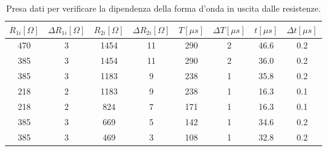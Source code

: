 \documentclass[10pt,a4paper]{article}
\begin{document}

\begin{table}[!htb]
\centering
\begin{tabular}{|c|c|c|c|c|c|c|c|}
\hline 
$R_{1i} [\Omega]$ & $\Delta R_{1i} [\Omega]$ & $R_{2i} [\Omega]$  & $\Delta R_{2i} [\Omega]$ & $T [\mu s]$ & $\Delta T [\mu s]$&$t [\mu s ]$ & $\Delta t [\mu s]$\\
\hline
 470 & 3 & 1454	& 11 & 290 & 2& 46.6& 0.2\\ 
\hline
385 & 3 & 1454	& 11 & 290 & 2& 36.0& 0.2\\ 
\hline 
 385 & 3 & 1183	& 9 & 238 & 1& 35.8& 0.2\\
\hline
218 & 2 & 1183	& 9 & 238 & 1& 16.3& 0.1\\ 
\hline
218 & 2 & 824	& 7 & 171 & 1& 16.3& 0.1\\ 
\hline
385 & 3 & 669	& 5 & 142 & 1& 34.6& 0.2\\ 
\hline
 385 & 3 & 469	& 3 & 108 & 1& 32.8& 0.2\\ 
 \hline
\end{tabular} 
\caption{Presa dati per verificare la dipendenza della forma d'onda in uscita dalle resistenze.\label{tab:generatore}}
\end{table}
\end{document}
